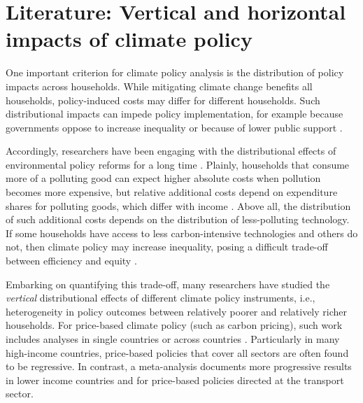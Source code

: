 \documentclass[12pt, a4paper]{article}
\begin{document}
\section{Literature: Vertical and horizontal impacts of climate policy} \label{sec:literature}

One important criterion for climate policy analysis is the distribution of policy impacts across households. While mitigating climate change benefits all households, policy-induced costs may differ for different households. Such distributional impacts can impede policy implementation, for example because governments oppose to increase inequality or because of lower public support \autocite{Bergquist.2022,Douenne.2022}. 

Accordingly, researchers have been engaging with the distributional effects of environmental policy reforms for a long time \autocite{Cremer.2003,Poterba.1991,Sandmo.1975,Stiglitz.2019}. Plainly, households that consume more of a polluting good can expect higher absolute costs when pollution becomes more expensive, but relative additional costs depend on expenditure shares for polluting goods, which differ with income \autocite{Jacobs.2019,Dorband.2019}. Above all, the distribution of such additional costs depends on the distribution of less-polluting technology. If some households have access to less carbon-intensive technologies and others do not, then climate policy may increase inequality, posing a difficult trade-off between efficiency and equity \autocite{Hansel.2022}. 

Embarking on quantifying this trade-off, many researchers have studied the \textit{vertical} distributional effects of different climate policy instruments, i.e., heterogeneity in policy outcomes between relatively poorer and relatively richer households. For price-based climate policy (such as carbon pricing), such work includes analyses in single countries \autocite{Goulder.2019,Grainger.2010,Rausch.2011,Garaffa.2021,Sterner.2012,Wu.2022} or across countries \autocite{Budolfson.2021,Feindt.2021,Dorband.2019,Steckel.2021b,VogtSchilb.2019,Missbach.2024}. Particularly in many high-income countries, price-based policies that cover all sectors are often found to be regressive. In contrast, a meta-analysis \autocite{Ohlendorf.2021} documents more progressive results in lower income countries and for price-based policies directed at the transport sector.
\end{document}

